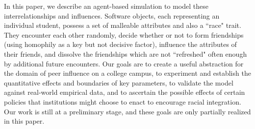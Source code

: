 In this paper, we describe an agent-based simulation to model these
interrelationships and influences. Software objects, each representing an
individual student, possess a set of malleable attributes and also a ``race"
trait. They encounter each other randomly, decide whether or not to form
friendships (using homophily as a key but not decisive factor), influence the
attributes of their friends, and dissolve the friendships which are not
``refreshed" often enough by additional future encounters. Our goals are to
create a useful abstraction for the domain of peer influence on a college
campus, to experiment and establish the quantitative effects and boundaries of
key parameters, to validate the model against real-world empirical data, and
to ascertain the possible effects of certain policies that institutions might
choose to enact to encourage racial integration. Our work is still at a
preliminary stage, and these goals are only partially realized in this paper.

